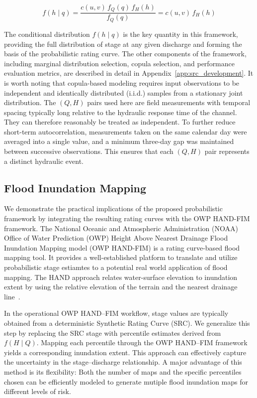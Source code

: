 \documentclass[11pt]{article}
\begin{document}
\begin{equation}
    f(h \mid q) = \frac{c(u, v)\, f_Q(q)\, f_H(h)}{f_Q(q)} = c(u, v)\, f_H(h)
    \label{eq:copula}
\end{equation}

The conditional distribution $f(h \mid q)$ is the key quantity in this framework, providing the full distribution of stage at any given discharge and forming the basis of the probabilistic rating curve. The other components of the framework, including marginal distribution selection, copula selection, and performance evaluation metrics, are described in detail in Appendix~\ref{app:src_development}. It is worth noting that copula-based modeling requires input observations to be independent and identically distributed (i.i.d.) samples from a stationary joint distribution. The $(Q, H)$ pairs used here are field measurements with temporal spacing typically long relative to the hydraulic response time of the channel. They can therefore reasonably be treated as independent. To further reduce short-term autocorrelation, measurements taken on the same calendar day were averaged into a single value, and a minimum three-day gap was maintained between successive observations. This ensures that each $(Q, H)$ pair represents a distinct hydraulic event.


\subsection{Flood Inundation Mapping}
We demonstrate the practical implications of the proposed probabilistic framework by integrating the resulting rating curves with the OWP HAND-FIM framework. The National Oceanic and Atmospheric Administration (NOAA) Office of Water Prediction (OWP) Height Above Nearest Drainage Flood Inundation Mapping model (OWP HAND-FIM) is a rating curve-based flood mapping tool. It provides a well-established platform to translate and utilize probabilistic stage estiamtes to a potential real world application of flood mapping. The HAND approach relates water-surface elevation to inundation extent by using the relative elevation of the terrain and the nearest drainage line~\cite{aristizabal2023}.

In the operational OWP HAND--FIM workflow, stage values are typically obtained from a deterministic Synthetic Rating Curve (SRC). We generalize this step by replacing the SRC stage with percentile estimates derived from $f(H \mid Q)$. Mapping each percentile through the OWP HAND--FIM framework yields a corresponding inundation extent. This approach can effectively capture the uncertainty in the stage--discharge relationship. A major advantage of this method is its flexibility: Both the number of maps and the specific percentiles chosen can be efficiently modeled to generate mutiple flood inundation maps for different levels of risk.
\end{document}
